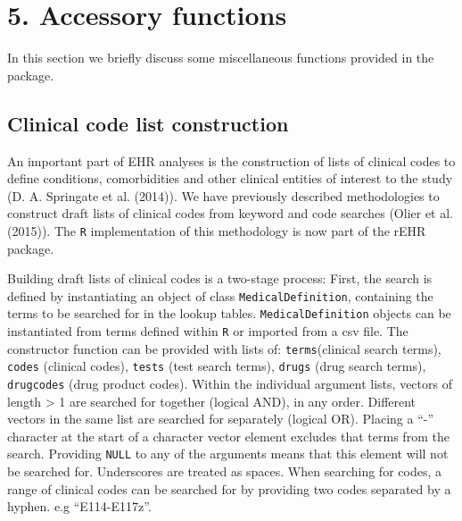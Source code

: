 \documentclass[]{article}
\begin{document}
\section{5. Accessory functions}\label{accessory-functions}

In this section we briefly discuss some miscellaneous functions provided
in the package.

\subsection{Clinical code list
construction}\label{clinical-code-list-construction}

An important part of EHR analyses is the construction of lists of
clinical codes to define conditions, comorbidities and other clinical
entities of interest to the study (D. A. Springate et al. (2014)). We
have previously described methodologies to construct draft lists of
clinical codes from keyword and code searches (Olier et al. (2015)). The
\texttt{R} implementation of this methodology is now part of the rEHR
package.

Building draft lists of clinical codes is a two-stage process: First,
the search is defined by instantiating an object of class
\texttt{MedicalDefinition}, containing the terms to be searched for in
the lookup tables. \texttt{MedicalDefinition} objects can be
instantiated from terms defined within \texttt{R} or imported from a csv
file. The constructor function can be provided with lists of:
\texttt{terms}(clinical search terms), \texttt{codes} (clinical codes),
\texttt{tests} (test search terms), \texttt{drugs} (drug search terms),
\texttt{drugcodes} (drug product codes). Within the individual argument
lists, vectors of length \textgreater{} 1 are searched for together
(logical AND), in any order. Different vectors in the same list are
searched for separately (logical OR). Placing a ``-'' character at the
start of a character vector element excludes that terms from the search.
Providing \texttt{NULL} to any of the arguments means that this element
will not be searched for. Underscores are treated as spaces. When
searching for codes, a range of clinical codes can be searched for by
providing two codes separated by a hyphen. e.g ``E114-E117z''.
\end{document}
